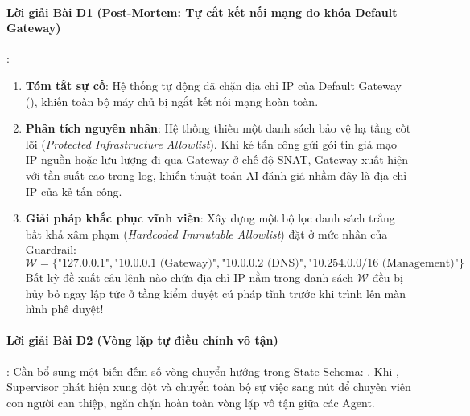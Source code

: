 \paragraph{Lời giải Bài D1 (Post-Mortem: Tự cắt kết nối mạng do khóa Default Gateway)}:
\begin{enumerate}
  \item \textbf{Tóm tắt sự cố}: Hệ thống tự động đã chặn địa chỉ IP của Default Gateway (), khiến toàn bộ máy chủ bị ngắt kết nối mạng hoàn toàn.
  \item \textbf{Phân tích nguyên nhân}: Hệ thống thiếu một danh sách bảo vệ hạ tầng cốt lõi (\textit{Protected Infrastructure Allowlist}). Khi kẻ tấn công gửi gói tin giả mạo IP nguồn hoặc lưu lượng đi qua Gateway ở chế độ SNAT, Gateway xuất hiện với tần suất cao trong log, khiến thuật toán AI đánh giá nhầm đây là địa chỉ IP của kẻ tấn công.
  \item \textbf{Giải pháp khắc phục vĩnh viễn}:
  Xây dựng một bộ lọc danh sách trắng bất khả xâm phạm (\textit{Hardcoded Immutable Allowlist}) đặt ở mức nhân của Guardrail:
  \begin{equation*}
  \mathcal{W} = \{\text{"127.0.0.1"}, \text{"10.0.0.1 (Gateway)"}, \text{"10.0.0.2 (DNS)"}, \text{"10.254.0.0/16 (Management)"}\}
  \end{equation*}
  Bất kỳ đề xuất câu lệnh nào chứa địa chỉ IP nằm trong danh sách $\mathcal{W}$ đều bị hủy bỏ ngay lập tức ở tầng kiểm duyệt cú pháp tĩnh trước khi trình lên màn hình phê duyệt!
\end{enumerate}

\paragraph{Lời giải Bài D2 (Vòng lặp tự điều chỉnh vô tận)}:
Cần bổ sung một biến đếm số vòng chuyển hướng trong State Schema: . Khi , Supervisor phát hiện xung đột và chuyển toàn bộ sự việc sang nút  để chuyên viên con người can thiệp, ngăn chặn hoàn toàn vòng lặp vô tận giữa các Agent.

